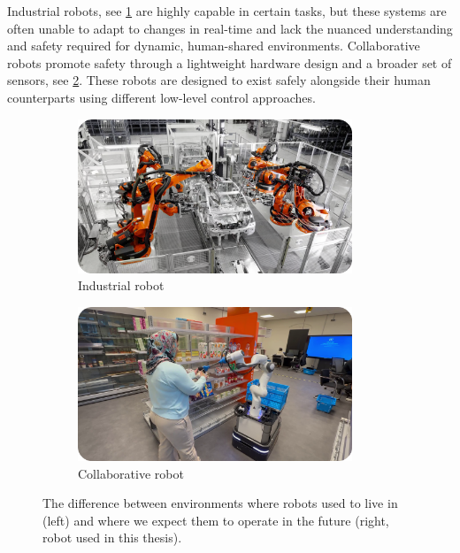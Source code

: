 Industrial robots, see \cref{fig:industrial_robot}
are highly capable in certain tasks, but
these systems are often unable to adapt to changes in
real-time and lack the nuanced understanding and safety required for
dynamic, human-shared environments. Collaborative robots
promote safety through a lightweight
hardware design and a broader set of sensors, see
\cref{fig:collaborative_robot}. These
robots are designed to exist safely alongside their human
counterparts using different low-level control approaches.
%
\begin{figure}[t]
  \centering
  \begin{subfigure}{0.5\textwidth}
    \centering
    \includegraphics[width=0.9\textwidth]{src/introduction/img/industrial_robot.png}
    \caption{Industrial robot}
    \label{fig:industrial_robot}
  \end{subfigure}%
  \begin{subfigure}{0.5\textwidth}
    \centering
    \includegraphics[width=0.9\textwidth]{src/introduction/img/collaborative_robot.png}
    \caption{Collaborative robot}
    \label{fig:collaborative_robot}
  \end{subfigure}
  \caption[]{The difference between environments where robots
  used to live in (left) \footnotemark and where we expect them to operate
  in the future (right, robot used in this thesis).}
  \label{fig:different_robots}
\end{figure}

